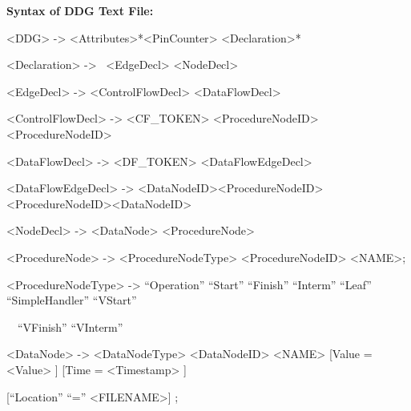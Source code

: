\documentclass[letterpaper]{article}
\begin{document}
\bigskip

\textbf{Syntax of DDG Text File:}


\bigskip

{\textless}DDG{\textgreater} -{\textgreater} {\textless}Attributes{\textgreater}*{\textless}PinCounter{\textgreater} {\textless}Declaration{\textgreater}*

{\textless}Declaration{\textgreater} -{\textgreater}~ {\textless}EdgeDecl{\textgreater} {\textbar} {\textless}NodeDecl{\textgreater}~

{\textless}EdgeDecl{\textgreater} -{\textgreater} {\textless}ControlFlowDecl{\textgreater} {\textbar} {\textless}DataFlowDecl{\textgreater}

{\textless}ControlFlowDecl{\textgreater} -{\textgreater} {\textless}CF\_TOKEN{\textgreater} {\textless}ProcedureNodeID{\textgreater}{\textless}ProcedureNodeID{\textgreater}

{\textless}DataFlowDecl{\textgreater} -{\textgreater} {\textless}DF\_TOKEN{\textgreater} {\textless}DataFlowEdgeDecl{\textgreater}

{\textless}DataFlowEdgeDecl{\textgreater} -{\textgreater} {\textless}DataNodeID{\textgreater}{\textless}ProcedureNodeID{\textgreater} {\textbar} {\textless}ProcedureNodeID{\textgreater}{\textless}DataNodeID{\textgreater}

{\textless}NodeDecl{\textgreater} -{\textgreater} {\textless}DataNode{\textgreater} {\textbar} {\textless}ProcedureNode{\textgreater}

{\textless}ProcedureNode{\textgreater} -{\textgreater} {\textless}ProcedureNodeType{\textgreater} {\textless}ProcedureNodeID{\textgreater} {\textless}NAME{\textgreater}{\textquotedbl};{\textquotedbl}

{\textless}ProcedureNodeType{\textgreater} -{\textgreater} ``Operation'' {\textbar} ``Start'' {\textbar} ``Finish'' {\textbar} ``Interm'' {\textbar} ``Leaf'' {\textbar} ``SimpleHandler'' {\textbar} ``VStart'' {\textbar}

\ \ {}``VFinish'' {\textbar} ``VInterm''

{\textless}DataNode{\textgreater} -{\textgreater} {\textless}DataNodeType{\textgreater} {\textless}DataNodeID{\textgreater} {\textless}NAME{\textgreater} [{\textquotedbl}Value{\textquotedbl} {\textquotedbl}={\textquotedbl}{\textless}Value{\textgreater} ] [{\textquotedbl}Time{\textquotedbl} {\textquotedbl}={\textquotedbl} {\textless}Timestamp{\textgreater} ]

[``Location'' ``='' {\textless}FILENAME{\textgreater}] {\textquotedbl};{\textquotedbl}
\end{document}
